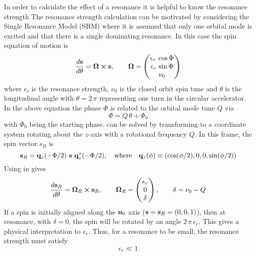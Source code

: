 In order to calculate the effect of a resonance it is helpful to know the resonance strength
The resonance strength calculation can be motivated by considering the Single Resonance Model
(SRM)\cite{b:spin.hoff} where it is assumed that only one orbital mode is excited and that there is
a single dominating resonance. In this case the
spin equation of motion is
\begin{equation}
  \frac{d {\bf s}}{d \theta} = {\bf \Omega} \mathbin{\boldsymbol{\times}} {\bf s}, \qquad 
  {\bf \Omega} = \begin{pmatrix}
    \epsilon_r \, \cos \Phi \\
    \epsilon_r \, \sin \Phi \\
    \nu_0
  \end{pmatrix}
  \label{stos}
\end{equation}
where $\epsilon_r$ is the resonance strength, $\nu_0$ is the closed orbit spin tune and $\theta$ is
the longitudinal angle with $\theta = 2 \, \pi$ representing one turn in the circular accelerator.
In the above equation the phase $\Phi$ is related to the orbital mode tune $Q$ via
\begin{equation}
  \Phi = Q \, \theta + \Phi_0
\end{equation}
with $\Phi_0$ being the starting phase.  can be solved by transforming to a coordinate
system rotating about the $z$-axis with a rotational frequency $Q$. In this frame, the spin vector
$s_R$ is
\begin{equation}
  {\bf s}_R = {\bf q}_z(-\Phi/2) \,\, {\bf s} \,\, {\bf q}_z^*(-\Phi/2), \quad \text{where} \quad
  {\bf q}_z(\phi) \equiv (\cos (\phi/2), 0, 0, \sin (\phi/2))
  \label{rqsq}
\end{equation}
Using  in  gives
\begin{equation}
  \frac{d {\bf s}_R}{d \theta} = {\bf \Omega}_R \mathbin{\boldsymbol{\times}} {\bf s}_R, \qquad
  {\bf \Omega}_R = \begin{pmatrix}
    \epsilon_r \\
    0 \\
    \delta 
  \end{pmatrix},
  \qquad
  \delta = \nu_0 - Q
  \label{stos2}
\end{equation}
If a spin is initially aligned along the ${\bf n}_0$ axis (${\bf s} = {\bf s}_R = (0, 0, 1)$), then at
resonance, with $\delta = 0$, the spin will be rotated by an angle $2 \, \pi \, \epsilon_r$. This
gives a physical interpretation to $\epsilon_r$. Thus, for a resonance to be small, the resonance
strength must satisfy
\begin{equation}
  \epsilon_r \ll 1
  \label{r1}
\end{equation}

